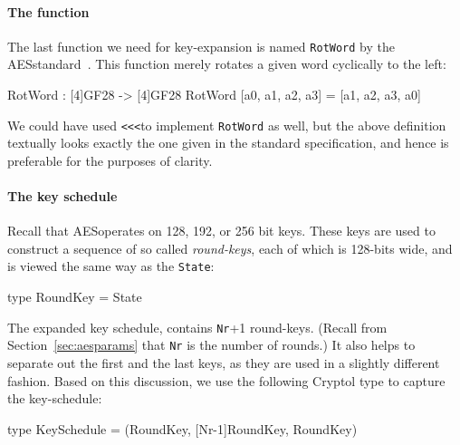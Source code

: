 \paragraph*{The {} function} The last
function we need for key-expansion is named {\tt RotWord} by the
AES\indAES standard~\cite[Section 5.2]{aes}. This function merely
rotates a given word cyclically to the left:
\begin{code}
  RotWord : [4]GF28 -> [4]GF28
  RotWord [a0, a1, a2, a3] = [a1, a2, a3, a0]
\end{code}
We could have used \verb+<<<+\indRotLeft to implement {\tt RotWord} as
well, but the above definition textually looks exactly the one given
in the standard specification, and hence is preferable for the
purposes of clarity.


\paragraph*{The key schedule} Recall that AES\indAES operates on 128,
192, or 256 bit keys.  These keys are used to construct a sequence of
so called {\em round-keys}, each of which is 128-bits wide, and is
viewed the same way as the {\tt State}:
\begin{code}
  type RoundKey = State
\end{code}
The expanded key schedule, contains {\tt Nr}+1 round-keys.  (Recall
from Section~\ref{sec:aesparams} that {\tt Nr} is the number of
rounds.)  It also helps to separate out the first and the last keys,
as they are used in a slightly different fashion.  Based on this
discussion, we use the following Cryptol type to capture the
key-schedule:
\begin{code}
  type KeySchedule = (RoundKey, [Nr-1]RoundKey, RoundKey) 
\end{code}

